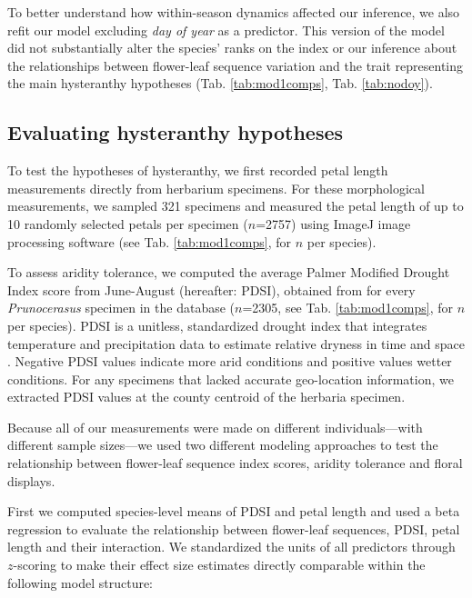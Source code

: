 \documentclass{article}[12pt]
\begin{document}
To better understand how within-season dynamics affected our inference, we also refit our model excluding \emph{day of year} as a predictor. This version of the model did not substantially alter the species' ranks on the index or our inference about the relationships between flower-leaf sequence variation and the trait representing the main hysteranthy hypotheses (Tab. \ref{tab:mod1comps}, Tab. \ref{tab:nodoy}). 

\subsection*{Evaluating hysteranthy hypotheses}
To test the hypotheses of hysteranthy, we first recorded petal length measurements directly from herbarium specimens. For these morphological measurements, we sampled 321 specimens and measured the petal length of up to 10 randomly selected petals per specimen ($n$=2757) using ImageJ image processing software (see Tab. \ref{tab:mod1comps}, for $n$ per species).%

To assess aridity tolerance, we computed the average Palmer Modified Drought Index score from June-August (hereafter: PDSI), obtained from \citet{Gile_2017} for every \textit{Prunocerasus} specimen in the database ($n$=2305, see Tab. \ref{tab:mod1comps}, for $n$ per species). PDSI is a unitless, standardized drought index that integrates temperature and precipitation data to estimate relative dryness in time and space \citep{Heim:2002uw}. Negative PDSI values indicate more arid conditions and positive values wetter conditions. %
For any specimens that lacked accurate geo-location information, we extracted PDSI values at the county centroid of the herbaria specimen. 

Because all of our measurements were made on different individuals---with different sample sizes---we used two different modeling approaches to test the relationship between flower-leaf sequence index scores, aridity tolerance and floral displays.

First we computed species-level means of PDSI and petal length and used a beta regression to evaluate the relationship between flower-leaf sequences, PDSI, petal length and their interaction. We standardized the units of all predictors through $z$-scoring \citep{Gelman2007} to make their effect size estimates directly comparable within the following model structure:\\
\end{document}
